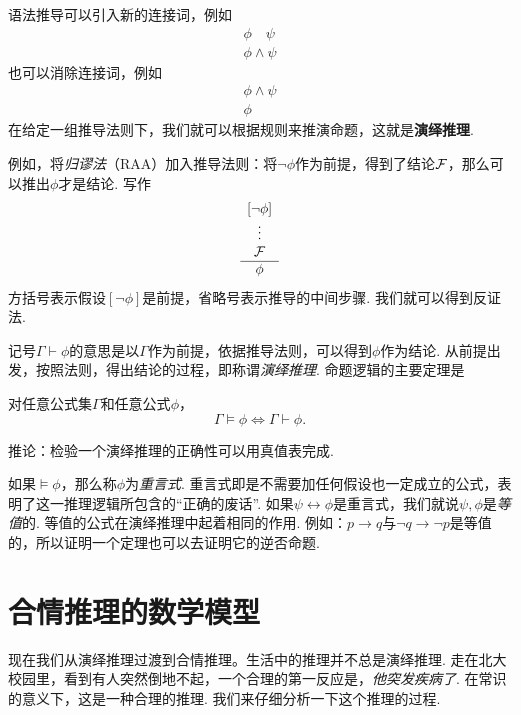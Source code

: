 语法推导可以引入新的连接词，例如
    \[\begin{array}{c}
         \phi\quad\psi  \\\hline
         \phi\wedge\psi
    \end{array}\]
也可以消除连接词，例如
    \[\begin{array}{c}
         \phi\wedge\psi  \\\hline
         \phi
    \end{array}\]
在给定一组推导法则下，我们就可以根据规则来推演命题，这就是\textbf{演绎推理}.

例如，将\emph{归谬法}（RAA）加入推导法则：将$\neg\phi$作为前提，得到了结论$\mathcal{F}$，那么可以推出$\phi$才是结论. 写作
    \[\begin{array}{c}
         [\neg\phi]  \\
         \vdots\\
         \mathcal{F}\\\hline
         \phi
    \end{array}\]
方括号表示假设$[\neg\phi]$是前提，省略号表示推导的中间步骤. 我们就可以得到反证法. 

记号$\Gamma\vdash\phi$的意思是以$\Gamma$作为前提，依据推导法则，可以得到$\phi$作为结论. 从前提出发，按照法则，得出结论的过程，即称谓\emph{演绎推理}. 命题逻辑的主要定理是
\begin{theorem}[完备性定理]
对任意公式集$\Gamma$和任意公式$\phi$，
\[\Gamma\models\phi\iff\Gamma\vdash\phi.\]
\end{theorem}
推论：检验一个演绎推理的正确性可以用真值表完成.

如果$\models \phi$，那么称$\phi$为\emph{重言式}. 重言式即是不需要加任何假设也一定成立的公式，表明了这一推理逻辑所包含的``正确的废话''. 如果$\psi\leftrightarrow\phi$是重言式，我们就说$\psi,\phi$是\emph{等值}的. 等值的公式在演绎推理中起着相同的作用. 例如：$p\to q$与$\neg q\to\neg p$是等值的，所以证明一个定理也可以去证明它的逆否命题.


\section{合情推理的数学模型}

现在我们从演绎推理过渡到合情推理。生活中的推理并不总是演绎推理. 走在北大校园里，看到有人突然倒地不起，一个合理的第一反应是，\emph{他突发疾病了}. 在常识的意义下，这是一种合理的推理. 我们来仔细分析一下这个推理的过程.


